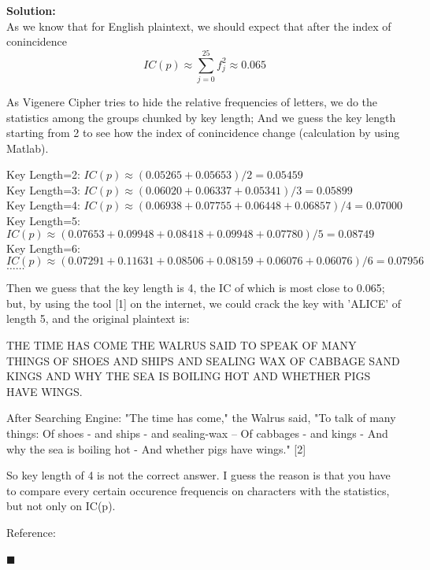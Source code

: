 \documentclass{article}
\newenvironment{solution}                               %
{\textbf{Solution:} \\}{$\blacksquare$\newline}         %
\begin{document}
    \begin{solution}
        As we know that for English plaintext, we should expect that after the  
        index of conincidence
        $$
            IC(p) \approx \sum\limits_{j=0}^{25} f_{j}^2 \approx 0.065
        $$

        As Vigenere Cipher tries to hide the relative frequencies of letters, we do the statistics among the groups chunked by key length; And we guess the key length starting from 2 to see how the index of conincidence change (calculation by using Matlab).
        
        Key Length=2: $IC(p) \approx (0.05265 + 0.05653)/2 = 0.05459$ \\
        Key Length=3: $IC(p) \approx (0.06020 + 0.06337 + 0.05341)/3 = 0.05899$ \\
        Key Length=4: $IC(p) \approx (0.06938 + 0.07755 + 0.06448 + 0.06857)/4 = 0.07000$ \\
        Key Length=5: $IC(p) \approx (0.07653 + 0.09948 + 0.08418 + 0.09948 + 0.07780)/5 = 0.08749$ \\
        Key Length=6: $IC(p) \approx (0.07291 + 0.11631 + 0.08506 + 0.08159 + 0.06076 + 0.06076)/6 = 0.07956$ \\
        $\dots \dots$

        Then we guess that the key length is 4, the IC of which is most close to 0.065; but, by using the tool [1] on the internet, we could crack the key with 'ALICE' of length 5, and the original plaintext is:

        THE TIME HAS COME THE WALRUS SAID TO SPEAK OF MANY THINGS OF SHOES AND SHIPS AND SEALING WAX OF CABBAGE SAND KINGS AND WHY THE SEA IS BOILING HOT AND WHETHER PIGS HAVE WINGS.

        After Searching Engine: "The time has come," the Walrus said, "To talk of many things: Of shoes - and ships - and sealing-wax -- Of cabbages - and kings - And why the sea is boiling hot - And whether pigs have wings." [2]

        So key length of 4 is not the correct answer. I guess the reason is that you have to compare every certain occurence frequencis on characters with the statistics, but not only on IC(p).

        Reference: \\
         \\
    \end{solution}
\end{document}
